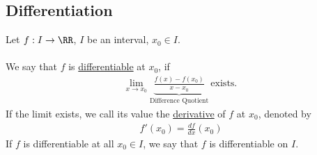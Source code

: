 \documentclass[class=scrartcl, crop=false]{standalone}
\begin{document}
\subsection{Differentiation}

\begin{definition}
  Let $f: I \to \RR$, $I$ be an interval, $x_0 \in I$.
  \\\\
  We say that $f$ is \ul{differentiable} at $x_0$, if  
  \begin{gather*}
    \lim_{x \to x_0} \underbrace{\frac{f(x) - f(x_0)}{x - x_0}}_{\text{Difference Quotient}} \ \text{exists.} \ 
  \end{gather*} 
  If the limit exists, we call its value the \ul{derivative} of $f$ at $x_0$, denoted by 
  \begin{gather*}
    f'(x_0) = \frac{df}{dx}(x_0)
  \end{gather*}
  If $f$ is differentiable at all $x_0 \in I$, we say that $f$ is differentiable on $I$.
\end{definition} 
\end{document}
